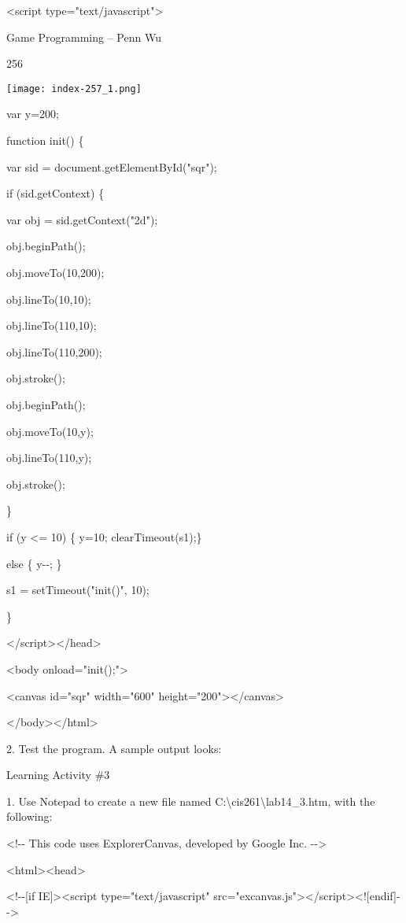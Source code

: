 \documentclass[
]{article}
\begin{document}
\textless script type="text/javascript"\textgreater{}

Game Programming -- Penn Wu

256

\protect\hypertarget{index_split_013.htmlux5cux23p257}{}{}\texttt{[image: index-257\_1.png]}

var y=200;

function init() \{

var sid = document.getElementById("sqr");

if (sid.getContext) \{

var obj = sid.getContext("2d");

obj.beginPath();

obj.moveTo(10,200);

obj.lineTo(10,10);

obj.lineTo(110,10);

obj.lineTo(110,200);

obj.stroke();

obj.beginPath();

obj.moveTo(10,y);

obj.lineTo(110,y);

obj.stroke();

\}

if (y \textless= 10) \{ y=10; clearTimeout(s1);\}

else \{ y-\/-; \}

s1 = setTimeout("init()", 10);

\}

\textless/script\textgreater\textless/head\textgreater{}

\textless body onload="init();"\textgreater{}

\textless canvas id="sqr" width="600"
height="200"\textgreater\textless/canvas\textgreater{}

\textless/body\textgreater\textless/html\textgreater{}

2. Test the program. A sample output looks:

Learning Activity \#3

1. Use Notepad to create a new file named
C:\textbackslash cis261\textbackslash lab14\_3.htm, with the following:

\textless!-\/- This code uses ExplorerCanvas, developed by Google Inc.
-\/-\textgreater{}

\textless html\textgreater\textless head\textgreater{}

\textless!-\/-{[}if IE{]}\textgreater\textless script
type="text/javascript"
src="excanvas.js"\textgreater\textless/script\textgreater\textless!{[}endif{]}-\/-\textgreater{}
\end{document}
